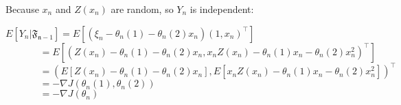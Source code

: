 \documentclass{article}
\begin{document}
Because $x_n$ and $Z(x_n)$ are random, so $Y_n$ is independent:
\begin{flushleft}
$ E[Y_n|\mathfrak{F_{n-1}}] = E[(\xi_n-\theta_n(1)-\theta_n(2)x_n)(1,x_n)^\intercal] $  \\
$ \ \ \ \ \ \ \ \ \ \ \ \ \ \ \ \ =E[(Z(x_n)-\theta_n(1)-\theta_n(2)x_n, x_nZ(x_n)-\theta_n(1)x_n-\theta_n(2)x_n^2)^\intercal] $  \\
$ \ \ \ \ \ \ \ \ \ \ \ \ \ \ \ \ =(E[Z(x_n)-\theta_n(1)-\theta_n(2)x_n], E[x_nZ(x_n)-\theta_n(1)x_n-\theta_n(2)x_n^2])^\intercal $  \\
$ \ \ \ \ \ \ \ \ \ \ \ \ \ \ \ \ =-\nabla J(\theta_n(1),\theta_n(2)) $  \\
$ \ \ \ \ \ \ \ \ \ \ \ \ \ \ \ \ =-\nabla J(\theta_n) $
\end{flushleft} 
\end{document}
